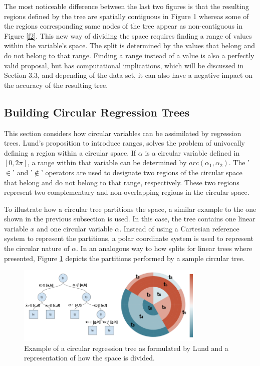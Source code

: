 \documentclass[times,twocolumn,final,authoryear]{elsarticle}
\begin{document}
The most noticeable difference between the last two figures is that the resulting regions defined by the tree are spatially contiguous in Figure 1 whereas some of the regions corresponding same nodes of the tree appear as non-contiguous in Figure \ref{f2}. This new way of dividing the space requires finding a range of values within the variable’s space. The split is determined by the values that belong and do not belong to that range. Finding a range instead of a value is also a perfectly valid proposal, but has computational implications, which will be discussed in Section 3.3, and depending of the data set, it can also have a negative impact on the accuracy of the resulting tree.

\subsection{Building Circular Regression Trees}

This section considers how circular variables can be assimilated by regression trees. Lund's proposition to introduce ranges, solves the problem of univocally defining a region within a circular space. If $\alpha$ is a circular variable defined in $[0, 2\pi]$, a range within that variable can be determined by $arc(\alpha_1, \alpha_2)$. The '$\in$' and '$\notin$' operators are used to designate two regions of the circular space that belong and do not belong to that range, respectively. These two regions represent two complementary and non-overlapping regions in the circular space.

To illustrate how a circular tree partitions the space, a similar example to the one shown in the previous subsection is used. In this case, the tree contains one linear variable $x$ and one circular variable $\alpha$. Instead of using a Cartesian reference system to represent the partitions, a polar coordinate system is used to represent the circular nature of $\alpha$. In an analogous way to how splits for linear trees where presented, Figure \ref{f3} depicts the partitions performed by a sample circular tree.

%
\begin{figure}
  \includegraphics[width=9cm]{fig3_master.png}
\caption{Example of a circular regression tree as formulated by Lund and a representation of how the space is divided.}
\label{f3}       %
\end{figure}
%
\end{document}
